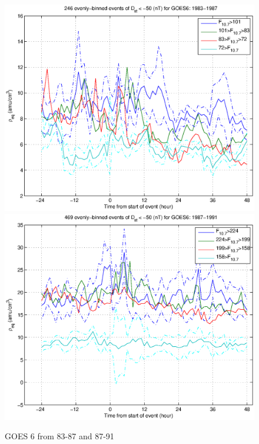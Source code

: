 \documentclass[10pt,twocolumn]{article}
\begin{document}
\begin{figure}[htp!]
\includegraphics[scale=0.45]{paperfigures/HighLowF107rhoeq-Dst50-GOES6-1983-1987.eps}
\includegraphics[scale=0.45]{paperfigures/HighLowF107rhoeq-Dst50-GOES6-1987-1991.eps}
\caption{GOES 6 from 83-87 and 87-91}
\end{figure}
\end{document}
